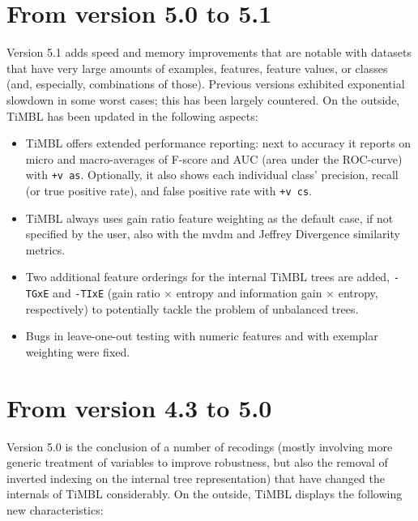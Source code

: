 \documentclass{book}
\begin{document}
\section{From version 5.0 to 5.1}

Version 5.1 adds speed and memory improvements that are notable with
datasets that have very large amounts of examples, features, feature
values, or classes (and, especially, combinations of those). Previous
versions exhibited exponential slowdown in some worst cases; this has
been largely countered. On the outside, TiMBL has been updated in the
following aspects:

\begin{itemize}

\item TiMBL offers extended performance reporting: next to accuracy it
  reports on micro and macro-averages of F-score and AUC (area under
  the ROC-curve) with {\tt +v as}. Optionally, it also shows each
  individual class' precision, recall (or true positive rate), and
  false positive rate with {\tt +v cs}.

\item TiMBL always uses gain ratio feature weighting as the default
  case, if not specified by the user, also with the {\sc mvdm} and
  Jeffrey Divergence similarity metrics.

\item Two additional feature orderings for the internal TiMBL trees
  are added, {\tt -TGxE} and {\tt -TIxE} (gain ratio $\times$ entropy
  and information gain $\times$ entropy, respectively) to potentially
  tackle the problem of unbalanced trees.

\item Bugs in leave-one-out testing with numeric features and with
  exemplar weighting were fixed.

\end{itemize}

\section{From version 4.3 to 5.0}

Version 5.0 is the conclusion of a number of recodings (mostly
involving more generic treatment of variables to improve robustness,
but also the removal of inverted indexing on the internal tree
representation) that have changed the internals of TiMBL
considerably. On the outside, TiMBL displays the following new
characteristics:
\end{document}
